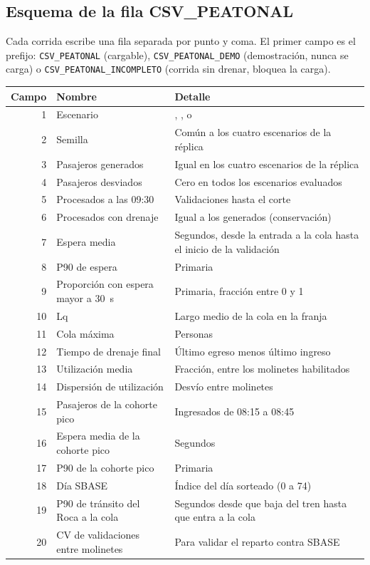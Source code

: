 \subsection{Esquema de la fila CSV\_PEATONAL}
\label{anx:csv}

Cada corrida escribe una fila separada por punto y coma. El primer campo es el prefijo:
\texttt{CSV\_PEATONAL} (cargable), \texttt{CSV\_PEATONAL\_DEMO} (demostración, nunca se carga) o
\texttt{CSV\_PEATONAL\_INCOMPLETO} (corrida sin drenar, bloquea la carga).

\begin{longtable}{@{}r>{\raggedright\arraybackslash}p{5.2cm}>{\raggedright\arraybackslash}p{7.5cm}@{}}
\toprule
Campo & Nombre & Detalle \\
\midrule
\endhead
1 & Escenario & \EO{}, \EI{}, \ET{} o \EIT{} \\
2 & Semilla & Común a los cuatro escenarios de la réplica \\
3 & Pasajeros generados & Igual en los cuatro escenarios de la réplica \\
4 & Pasajeros desviados & Cero en todos los escenarios evaluados \\
5 & Procesados a las 09:30 & Validaciones hasta el corte \\
6 & Procesados con drenaje & Igual a los generados (conservación) \\
7 & Espera media & Segundos, desde la entrada a la cola hasta el inicio de la validación \\
8 & P90 de espera & Primaria \\
9 & Proporción con espera mayor a 30~s & Primaria, fracción entre 0 y 1 \\
10 & Lq & Largo medio de la cola en la franja \\
11 & Cola máxima & Personas \\
12 & Tiempo de drenaje final & Último egreso menos último ingreso \\
13 & Utilización media & Fracción, entre los molinetes habilitados \\
14 & Dispersión de utilización & Desvío entre molinetes \\
15 & Pasajeros de la cohorte pico & Ingresados de 08:15 a 08:45 \\
16 & Espera media de la cohorte pico & Segundos \\
17 & P90 de la cohorte pico & Primaria \\
18 & Día SBASE & Índice del día sorteado (0 a 74) \\
19 & P90 de tránsito del Roca a la cola & Segundos desde que baja del tren hasta que entra a la cola \\
20 & CV de validaciones entre molinetes & Para validar el reparto contra SBASE \\
\bottomrule
\end{longtable}
